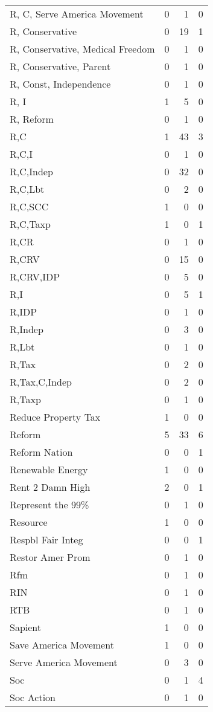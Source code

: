 \begin{supertabular}{lrrr}
R, C, Serve America Movement & 0 & 1 & 0\\
R, Conservative & 0 & 19 & 1\\
R, Conservative, Medical Freedom & 0 & 1 & 0\\
R, Conservative, Parent & 0 & 1 & 0\\
R, Const, Independence & 0 & 1 & 0\\
R, I & 1 & 5 & 0\\
R, Reform & 0 & 1 & 0\\
R,C & 1 & 43 & 3\\
R,C,I & 0 & 1 & 0\\
R,C,Indep & 0 & 32 & 0\\
R,C,Lbt & 0 & 2 & 0\\
R,C,SCC & 1 & 0 & 0\\
R,C,Taxp & 1 & 0 & 1\\
R,CR & 0 & 1 & 0\\
R,CRV & 0 & 15 & 0\\
R,CRV,IDP & 0 & 5 & 0\\
R,I & 0 & 5 & 1\\
R,IDP & 0 & 1 & 0\\
R,Indep & 0 & 3 & 0\\
R,Lbt & 0 & 1 & 0\\
R,Tax & 0 & 2 & 0\\
R,Tax,C,Indep & 0 & 2 & 0\\
R,Taxp & 0 & 1 & 0\\
Reduce Property Tax & 1 & 0 & 0\\
Reform & 5 & 33 & 6\\
Reform Nation & 0 & 0 & 1\\
Renewable Energy & 1 & 0 & 0\\
Rent 2 Damn High & 2 & 0 & 1\\
Represent the 99\% & 0 & 1 & 0\\
Resource & 1 & 0 & 0\\
Respbl Fair Integ & 0 & 0 & 1\\
Restor Amer Prom & 0 & 1 & 0\\
Rfm & 0 & 1 & 0\\
RIN & 0 & 1 & 0\\
RTB & 0 & 1 & 0\\
Sapient & 1 & 0 & 0\\
Save America Movement & 1 & 0 & 0\\
Serve America Movement & 0 & 3 & 0\\
Soc & 0 & 1 & 4\\
Soc Action & 0 & 1 & 0\\

\end{supertabular}
